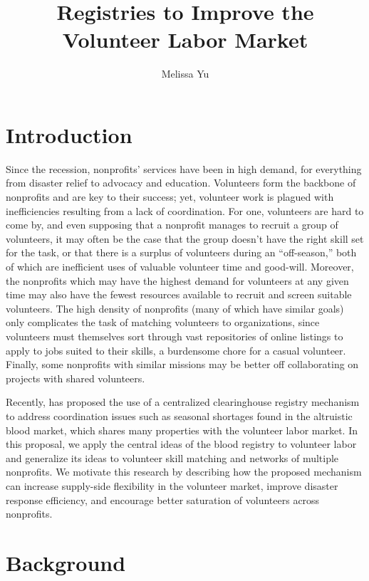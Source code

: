 \documentclass[11pt, margin=1in]{article}
\begin{document}
	
\title{Registries to Improve the Volunteer Labor Market}
\author{Melissa Yu}
\date{}
\maketitle

\section{Introduction}

Since the recession, nonprofits' services have been in high demand, for everything from disaster relief to advocacy and education. Volunteers form the backbone of nonprofits and are key to their success; yet, volunteer work is plagued with inefficiencies resulting from a lack of coordination. For one, volunteers are hard to come by, and even supposing that a nonprofit manages to recruit a group of volunteers, it may often be the case that the group doesn't have the right skill set for the task, or that there is a surplus of volunteers during an ``off-season,'' both of which are inefficient uses of valuable volunteer time and good-will. Moreover, the nonprofits which may have the highest demand for volunteers at any given time may also have the fewest resources available to recruit and screen suitable volunteers. The high density of nonprofits (many of which have similar goals) only complicates the task of matching volunteers to organizations, since volunteers must themselves sort through vast repositories of online listings to apply to jobs suited to their skills, a burdensome chore for a casual volunteer. Finally, some nonprofits with similar missions may be better off collaborating on projects with shared volunteers. 

Recently, \cite{blood-registry} has proposed the use of a centralized clearinghouse registry mechanism to address coordination issues such as seasonal shortages found in the altruistic blood market, which shares many properties with the volunteer labor market. In this proposal, we apply the central ideas of the blood registry to volunteer labor and generalize its ideas to volunteer skill matching and networks of multiple nonprofits. We motivate this research by describing how the proposed mechanism can increase supply-side flexibility in the volunteer market, improve disaster response efficiency, and encourage better saturation of volunteers across nonprofits.

\section{Background}
\end{document}
